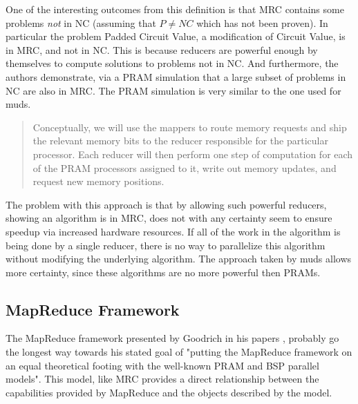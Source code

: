 \documentclass{article}
\begin{document}
One of the interesting outcomes from this definition is that MRC contains some problems \emph{not} in NC (assuming that $P \ne NC$ which has not been proven). In particular the problem Padded Circuit Value, a modification of Circuit Value, is in MRC, and not in NC. This is because reducers are powerful enough by themselves to compute solutions to problems not in NC. And furthermore, the authors demonstrate, via a PRAM simulation that a large subset of problems in NC are also in MRC. The PRAM simulation is very similar to the one used for muds. 

\begin{quotation}
Conceptually,
we will use the mappers to route memory requests and
ship the relevant memory bits to the reducer responsible
for the particular processor. Each reducer will then
perform one step of computation for each of the PRAM
processors assigned to it, write out memory updates,
and request new memory positions. \cite{mrc}
\end{quotation}

The problem with this approach is that by allowing such powerful reducers, showing an algorithm is in MRC, does not with any certainty seem to ensure speedup via increased hardware resources. If all of the work in the algorithm is being done by a single reducer, there is no way to parallelize this algorithm without modifying the underlying algorithm. The approach taken by muds allows more certainty, since these algorithms are no more powerful then PRAMs.  


\subsection{MapReduce Framework} 
The MapReduce framework presented by Goodrich in his papers \cite{goodrich1}, \cite{goodrich2} probably go the longest way towards his stated goal of "putting the MapReduce framework on an equal theoretical footing with the well-known PRAM and BSP parallel models". This model, like MRC provides a direct relationship between the capabilities provided by MapReduce and the objects described by the model.
\end{document}
